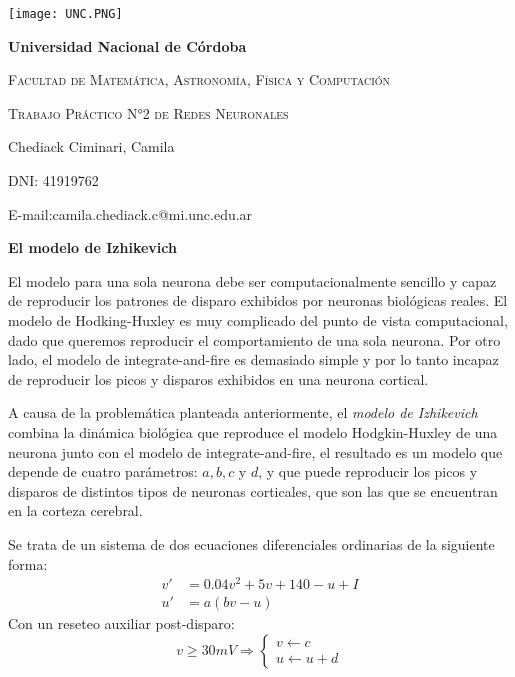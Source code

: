 \documentclass[12pt,a4paper]{article}
\begin{document}
\begin{titlepage}

\centering
\texttt{[image: UNC.PNG]}

\vspace{1cm}
{\bfseries\LARGE Universidad Nacional de Córdoba \par}
\vspace{1cm}
{\scshape\Large Facultad de Matemática, Astronomía, Física y Computación\par}
\vspace{1cm}
{\scshape\Huge Trabajo Práctico N°2 de Redes Neuronales}
\vspace{1cm}

{\Large Chediack Ciminari, Camila }
\vspace*{0.3cm}


DNI: 41919762 \\


\vspace*{0.3cm}

E-mail:camila.chediack.c@mi.unc.edu.ar

\end{titlepage}

\begin{center}
\begin{large}
\textbf{El modelo de Izhikevich}
\end{large}
\end{center}

El modelo para una sola neurona debe ser computacionalmente sencillo y capaz de reproducir los patrones de disparo exhibidos por neuronas biológicas reales. El modelo de Hodking-Huxley es muy complicado del punto de vista computacional, dado que queremos reproducir el comportamiento de una sola neurona. Por otro lado, el modelo de integrate-and-fire es demasiado simple y por lo tanto incapaz de reproducir los picos y disparos exhibidos en una neurona cortical.  

A causa de la problemática planteada anteriormente, el \textit{modelo de Izhikevich} combina la dinámica biológica que reproduce el modelo Hodgkin-Huxley de una neurona junto con el modelo de integrate-and-fire, el resultado es un modelo que depende de cuatro parámetros: $a,b,c$ y $d$, y que puede reproducir los picos y disparos de distintos tipos de neuronas corticales, que son las que se encuentran en la corteza cerebral. 

Se trata de un sistema de dos ecuaciones diferenciales ordinarias de la siguiente forma:
\begin{align*}
v' &= 0.04v^2 + 5v +140 -u + I \\
u' &= a(bv-u)
\end{align*}
Con un reseteo auxiliar post-disparo:
$$v \geq 30 mV \Rightarrow \left\{ \begin{array}{l}
v \leftarrow c \\
u \leftarrow u+d
\end{array} \right.$$
\end{document}
